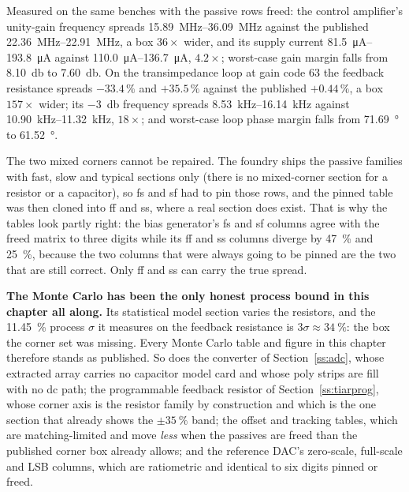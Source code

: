 Measured on the same benches with the passive rows freed: the control
amplifier's unity-gain frequency spreads \SIrange{15.89}{36.09}{\mega\hertz}
against the published \SIrange{22.36}{22.91}{\mega\hertz}, a box \(36\times\)
wider, and its supply current \SIrange{81.5}{193.8}{\micro\ampere} against
\SIrange{110.0}{136.7}{\micro\ampere}, \(4.2\times\); worst-case gain margin
falls from \SI{8.10}{\decibel} to \SI{7.60}{\decibel}. On the transimpedance
loop at gain code 63 the feedback resistance spreads \(-33.4\,\%\) and
\(+35.5\,\%\) against the published \(+0.44\,\%\), a box \(157\times\) wider;
its \SI{-3}{\decibel} frequency spreads \SIrange{8.53}{16.14}{\kilo\hertz}
against \SIrange{10.90}{11.32}{\kilo\hertz}, \(18\times\); and worst-case loop
phase margin falls from \SI{71.69}{\degree} to \SI{61.52}{\degree}.

The two mixed corners cannot be repaired. The foundry ships the passive families
with fast, slow and typical sections only (there is no mixed-corner section
for a resistor or a capacitor), so fs and sf had to pin those rows, and the
pinned table was then cloned into ff and ss, where a real section does exist.
That is why the tables look partly right: the bias generator's fs and sf columns
agree with the freed matrix to three digits while its ff and ss columns diverge
by \SI{47}{\percent} and \SI{25}{\percent}, because the two columns that were
always going to be pinned are the two that are still correct. Only ff and ss can
carry the true spread.

\textbf{The Monte Carlo has been the only honest process bound in this chapter
all along.} Its statistical model section varies the resistors, and the
\SI{11.45}{\percent} process \(\sigma\) it measures on the feedback resistance is
\(3\sigma \approx \SI{34}{\percent}\): the box the corner set was missing.
Every Monte Carlo table and figure in this chapter therefore stands as published.
So does the converter of Section~\ref{ss:adc}, whose extracted array carries no
capacitor model card and whose poly strips are fill with no dc path; the
programmable feedback resistor of
Section~\ref{ss:tiarprog}, whose corner axis is the resistor family by
construction and which is the one section that already shows the
\(\pm\SI{35}{\percent}\) band; the offset and tracking tables, which are
matching-limited and move \emph{less} when the passives are freed than the
published corner box already allows; and the reference DAC's zero-scale,
full-scale and LSB columns, which are ratiometric and identical to six digits
pinned or freed.

